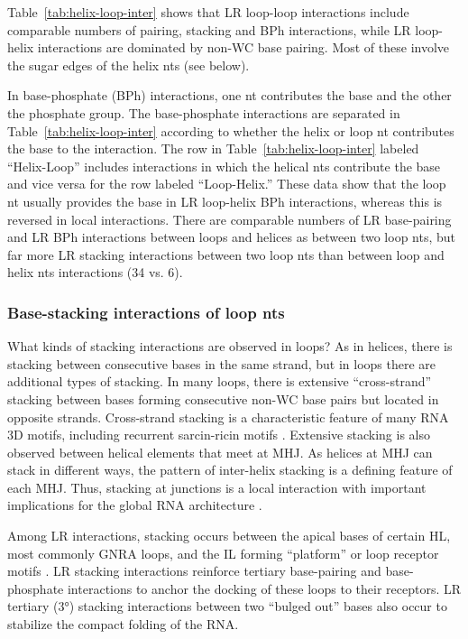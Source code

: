 Table~\ref{tab:helix-loop-inter} shows that LR loop-loop interactions include
comparable numbers of pairing, stacking and BPh interactions, while LR
loop-helix interactions are dominated by non-WC base pairing. Most of these
involve the sugar edges of the helix nts (see below). 

In base-phosphate (BPh) interactions, one nt contributes the base and the other
the phosphate group. The base-phosphate interactions are separated in
Table~\ref{tab:helix-loop-inter} according to whether the helix or loop nt
contributes the base to the interaction. The row in
Table~\ref{tab:helix-loop-inter} labeled ``Helix-Loop'' includes interactions in
which the helical nts contribute the base and vice versa for the row labeled
``Loop-Helix.'' These data show that the loop nt usually provides the base in LR
loop-helix BPh interactions, whereas this is reversed in local interactions.
There are comparable numbers of LR base-pairing and LR BPh interactions between
loops and helices as between two loop nts, but far more LR stacking interactions
between two loop nts than between loop and helix nts interactions (34 vs. 6). 

\subsubsection{Base-stacking interactions of loop nts}

What kinds of stacking interactions are observed in loops? As in helices, there
is stacking between consecutive bases in the same strand, but in loops there are
additional types of stacking. In many loops, there is extensive “cross-strand”
stacking between bases forming consecutive non-WC base pairs but located in
opposite strands. Cross-strand stacking is a characteristic feature of many RNA
3D motifs, including recurrent sarcin-ricin motifs \cite{Szewczak1993a}.
Extensive stacking is also observed between helical elements that meet at MHJ.
As helices at MHJ can stack in different ways, the pattern of inter-helix
stacking is a defining feature of each MHJ. Thus, stacking at junctions is a
local interaction with important implications for the global RNA architecture
\cite{Lescoute2006b}. 

Among LR interactions, stacking occurs between the apical bases of certain HL,
most commonly GNRA loops, and the IL forming ``platform'' or loop receptor motifs
\cite{Cate1996}. LR stacking interactions reinforce tertiary base-pairing and
base-phosphate interactions to anchor the docking of these loops to their
receptors. LR tertiary (3°) stacking interactions between two “bulged out” bases
also occur to stabilize the compact folding of the RNA. 

